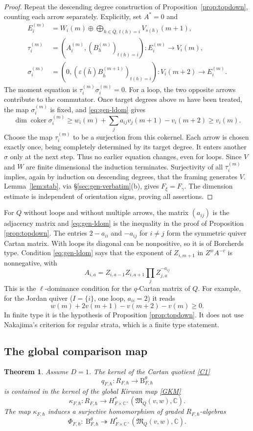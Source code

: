 \documentclass[11pt,reqno]{amsart}
\newtheorem{Theorem}{Theorem}[section]
\theoremstyle{definition}
\theoremstyle{remark}
\def\bbC{\mathbb C}
\def\B{\mathrm B}
\def\M{\mathfrak M}
\begin{document}
\begin{proof}
Repeat the descending degree construction of
Proposition~\ref{prop:topdown}, counting each arrow separately.
Explicitly, set $A^*=0$ and
\begin{align*}
E_i^{(m)}&=W_i(m)\oplus\bigoplus_{h\in\bar Q,\,t(h)=i}V_{s(h)}(m+1),\\
 \tau_i^{(m)}&=(A_i^{(m)},(B_h^{(m)})_{t(h)=i}):E_i^{(m)}\to V_i(m),\\
 \sigma_i^{(m)}&=(0,(\varepsilon(\bar h)B_{\bar h}^{(m+1)})_{t(h)=i}):
 V_i(m+2)\to E_i^{(m)}.
\end{align*}
The moment equation is $\tau_i^{(m)}\sigma_i^{(m)}=0$.
For a loop, the two opposite arrows contribute to the commutator.
Once target degrees above $m$ have been treated, the map $\sigma_i^{(m)}$
is fixed, and \eqref{eq:gen-ldom} gives
\[
 \dim\operatorname{coker}\sigma_i^{(m)}
 \geqslant w_i(m)+\sum_j a_{ij}v_j(m+1)-v_i(m+2)
 \geqslant v_i(m).
\]
Choose the map $\tau_i^{(m)}$ to be a surjection from this cokernel.
Each arrow is chosen exactly once, being completely determined by its target degree.
It enters
another $\sigma$ only at the next step. Thus no earlier equation
changes, even for loops. Since $V$ and $W$ are finite dimensional  the induction terminates.
Surjectivity of all $\tau_i^{(m)}$ implies, again by induction on descending degrees,
that the framing generates $V$. Lemma~\ref{lem:stab}, via
\S\ref{sec:gen-verbatim}(b), gives $F_\xi=F_\gamma$.
The dimension estimate is independent of orientation signs, proving
all assertions.
\end{proof}

For $Q$ without loops and without multiple arrows, 
the matrix $(a_{ij})$ is the adjacency matrix and \eqref{eq:gen-ldom} is the inequality in the proof of
Proposition \ref{prop:topdown}. 
The entries $2-a_{ii}$ and $-a_{ij}$ for $i\ne j$ form the
symmetric quiver Cartan matrix. With loops its diagonal can be
nonpositive, so it is of Borcherds type. Condition \eqref{eq:gen-ldom}
says that the exponent of $Z_{i,m+1}$ in $Z^{w}A^{-v}$ is nonnegative, with 
$$A_{i,a}=Z_{i,a-1}Z_{i,a+1}\prod_jZ_{j,a}^{-a_{ij}}$$
This is the $\ell$-dominance condition for the
$q$-Cartan matrix of $Q$. For example, for the Jordan quiver ($I=\{i\}$, one loop, $a_{ii}=2$) it reads 
$$w(m)+2v(m+1)-v(m+2)-v(m)\geqslant0.$$
In finite type it is
the hypothesis of Proposition \ref{prop:topdown}. It does not use Nakajima's criterion for regular strata, which is a finite type statement.

\subsection{The global comparison map}
\begin{Theorem}\label{thm:gen-global-map}
Assume $D=1$.
The kernel of the Cartan quotient \eqref{C1}
$$q_{F,\hbar}:R_{F,\hbar}\to \B^\theta_{F,\hbar}$$ 
is contained in the kernel of the global Kirwan map \eqref{GKM}
$$\kappa_{F,\hbar}:R_{F,\hbar}\to H^*_{F\times\bbC^\times}(\M_Q(v,w),\bbC).$$ 
The map $\kappa_{F,\hbar}$ induces a surjective homomorphism of graded $R_{F,\hbar}$-algebras
\[
\Phi_{F,\hbar}:\ \B^\theta_{F,\hbar}\twoheadrightarrow H^*_{F\times\bbC^\times}(\M_Q(v,w),\bbC).
\]
\end{Theorem}
\end{document}

